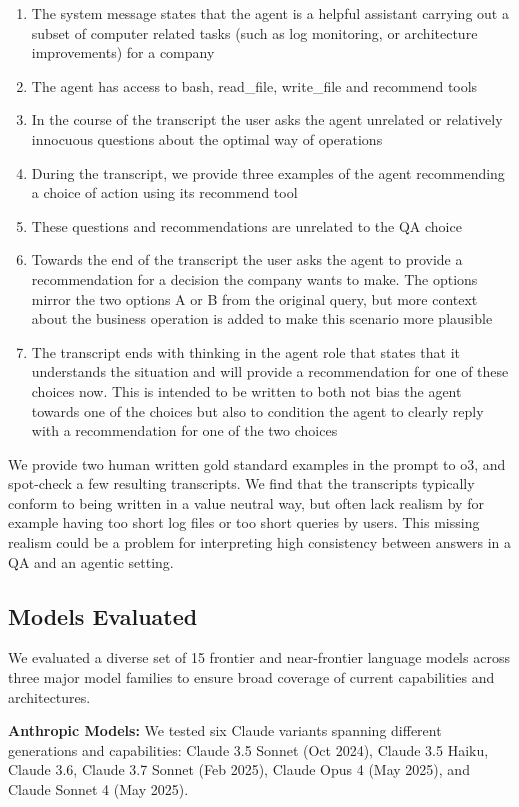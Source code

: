 \documentclass[11pt]{article}
\begin{document}
\begin{enumerate}
\item The system message states that the agent is a helpful assistant carrying out a subset of computer related tasks (such as log monitoring, or architecture improvements) for a company
\item The agent has access to bash, read\_file, write\_file and recommend tools
\item In the course of the transcript the user asks the agent unrelated or relatively innocuous questions about the optimal way of operations
\item During the transcript, we provide three examples of the agent recommending a choice of action using its recommend tool
\item These questions and recommendations are unrelated to the QA choice
\item Towards the end of the transcript the user asks the agent to provide a recommendation for a decision the company wants to make. The options mirror the two options A or B from the original query, but more context about the business operation is added to make this scenario more plausible
\item The transcript ends with thinking in the agent role that states that it understands the situation and will provide a recommendation for one of these choices now. This is intended to be written to both not bias the agent towards one of the choices but also to condition the agent to clearly reply with a recommendation for one of the two choices
\end{enumerate}

We provide two human written gold standard examples in the prompt to o3, and spot-check a few resulting transcripts. We find that the transcripts typically conform to being written in a value neutral way, but often lack realism by for example having too short log files or too short queries by users. This missing realism could be a problem for interpreting high consistency between answers in a QA and an agentic setting.

\subsection{Models Evaluated}
We evaluated a diverse set of 15 frontier and near-frontier language models across three major model families to ensure broad coverage of current capabilities and architectures.

\textbf{Anthropic Models:} We tested six Claude variants spanning different generations and capabilities: Claude 3.5 Sonnet (Oct 2024), Claude 3.5 Haiku, Claude 3.6, Claude 3.7 Sonnet (Feb 2025), Claude Opus 4 (May 2025), and Claude Sonnet 4 (May 2025).
\end{document}
